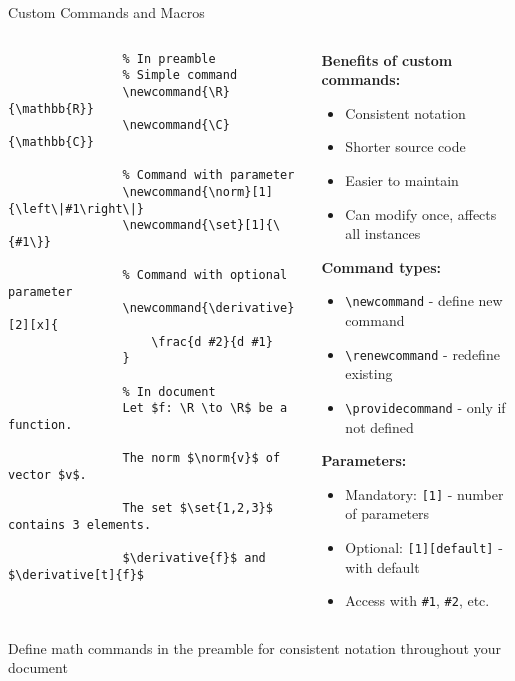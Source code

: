 \begin{frame}[fragile]{Custom Commands and Macros}
	\begin{columns}
		\begin{column}{0.5\textwidth}
			\begin{lstlisting}
				% In preamble
				% Simple command
				\newcommand{\R}{\mathbb{R}}
				\newcommand{\C}{\mathbb{C}}
				
				% Command with parameter
				\newcommand{\norm}[1]{\left\|#1\right\|}
				\newcommand{\set}[1]{\{#1\}}
				
				% Command with optional parameter
				\newcommand{\derivative}[2][x]{
					\frac{d #2}{d #1}
				}
				
				% In document
				Let $f: \R \to \R$ be a function.
				
				The norm $\norm{v}$ of vector $v$.
				
				The set $\set{1,2,3}$ contains 3 elements.
				
				$\derivative{f}$ and $\derivative[t]{f}$
			\end{lstlisting}
		\end{column}
		
		\begin{column}{0.5\textwidth}
			\textbf{Benefits of custom commands:}
			\begin{itemize}
				\item Consistent notation
				\item Shorter source code
				\item Easier to maintain
				\item Can modify once, affects all instances
			\end{itemize}
			
			\textbf{Command types:}
			\begin{itemize}
				\item \texttt{\textbackslash newcommand} - define new command
				\item \texttt{\textbackslash renewcommand} - redefine existing
				\item \texttt{\textbackslash providecommand} - only if not defined
			\end{itemize}
			
			\textbf{Parameters:}
			\begin{itemize}
				\item Mandatory: \texttt{[1]} - number of parameters
				\item Optional: \texttt{[1][default]} - with default
				\item Access with \texttt{\#1}, \texttt{\#2}, etc.
			\end{itemize}
		\end{column}
	\end{columns}
	
	\begin{tip}
		Define math commands in the preamble for consistent notation throughout your document
	\end{tip}
\end{frame}

